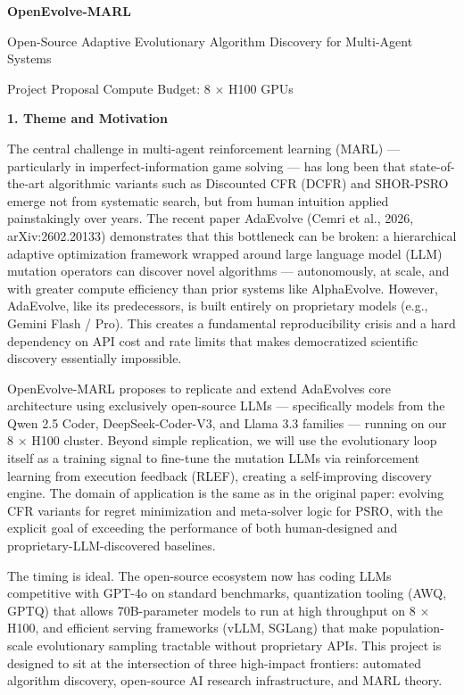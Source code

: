 

\textbf{OpenEvolve-MARL}

Open-Source Adaptive Evolutionary Algorithm Discovery for Multi-Agent
Systems

Project Proposal \textbar{} Compute Budget: 8 × H100 GPUs

\textbf{1. Theme and Motivation}

The central challenge in multi-agent reinforcement learning (MARL) ---
particularly in imperfect-information game solving --- has long been
that state-of-the-art algorithmic variants such as Discounted CFR (DCFR)
and SHOR-PSRO emerge not from systematic search, but from human
intuition applied painstakingly over years. The recent paper AdaEvolve
(Cemri et al., 2026, arXiv:2602.20133) demonstrates that this bottleneck
can be broken: a hierarchical adaptive optimization framework wrapped
around large language model (LLM) mutation operators can discover novel
algorithms --- autonomously, at scale, and with greater compute
efficiency than prior systems like AlphaEvolve. However, AdaEvolve, like
its predecessors, is built entirely on proprietary models (e.g., Gemini
Flash / Pro). This creates a fundamental reproducibility crisis and a
hard dependency on API cost and rate limits that makes democratized
scientific discovery essentially impossible.

OpenEvolve-MARL proposes to replicate and extend
AdaEvolve\textquotesingle s core architecture using exclusively
open-source LLMs --- specifically models from the Qwen 2.5 Coder,
DeepSeek-Coder-V3, and Llama 3.3 families --- running on our 8 × H100
cluster. Beyond simple replication, we will use the evolutionary loop
itself as a training signal to fine-tune the mutation LLMs via
reinforcement learning from execution feedback (RLEF), creating a
self-improving discovery engine. The domain of application is the same
as in the original paper: evolving CFR variants for regret minimization
and meta-solver logic for PSRO, with the explicit goal of exceeding the
performance of both human-designed and proprietary-LLM-discovered
baselines.

The timing is ideal. The open-source ecosystem now has coding LLMs
competitive with GPT-4o on standard benchmarks, quantization tooling
(AWQ, GPTQ) that allows 70B-parameter models to run at high throughput
on 8 × H100, and efficient serving frameworks (vLLM, SGLang) that make
population-scale evolutionary sampling tractable without proprietary
APIs. This project is designed to sit at the intersection of three
high-impact frontiers: automated algorithm discovery, open-source AI
research infrastructure, and MARL theory.

